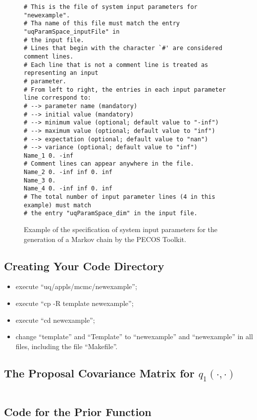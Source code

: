 \begin{figure}[h!]
\begin{verbatim}
# This is the file of system input parameters for "newexample".
# Tha name of this file must match the entry "uqParamSpace_inputFile" in
# the input file.
# Lines that begin with the character `#' are considered comment lines.
# Each line that is not a comment line is treated as representing an input
# parameter.
# From left to right, the entries in each input parameter line correspond to:
# --> parameter name (mandatory)
# --> initial value (mandatory)
# --> minimum value (optional; default value to "-inf")
# --> maximum value (optional; default value to "inf")
# --> expectation (optional; default value to "nan")
# --> variance (optional; default value to "inf")
Name_1 0. -inf
# Comment lines can appear anywhere in the file.
Name_2 0. -inf inf 0. inf
Name_3 0.
Name_4 0. -inf inf 0. inf
# The total number of input parameter lines (4 in this example) must match
# the entry "uqParamSpace_dim" in the input file.
\end{verbatim}
\caption{Example of the specification of system input parameters for the generation of a Markov chain by the PECOS Toolkit.
}
\label{fig-dram-par-file-ex}
\end{figure}

\subsection{Creating Your Code Directory}\label{subsc-gmc-seven-steps-myexample}

\begin{itemize}
\item execute ``uq/appls/mcmc/newexample'';
\item execute ``cp -R template newexample'';
\item execute ``cd newexample'';
\item change ``template'' and ``Template'' to ``newexample'' and ``newexample'' in all files, including the file ``Makefile''.
\end{itemize}

\subsection{The Proposal Covariance Matrix for $q_1(\cdot,\cdot)$}\label{subsc-gmc-seven-steps-proposal-cov-matrix-for-q1}
$~$\\

\subsection{Code for the Prior Function}\label{subsc-gmc-seven-steps-prior-code}

